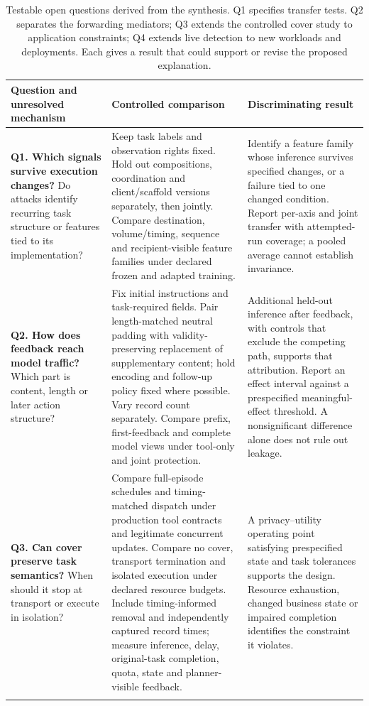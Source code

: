\begin{table}[t]\centering\small
\caption{Testable open questions derived from the synthesis. Q1 specifies transfer tests. Q2 separates the forwarding mediators; Q3 extends the controlled cover study to application constraints; Q4 extends live detection to new workloads and deployments. Each gives a result that could support or revise the proposed explanation.}\label{tab:open-questions}
\setlength{\tabcolsep}{4pt}
\begin{tabularx}{\textwidth}{@{}P{.22\textwidth}P{.43\textwidth}Y@{}}\toprule
Question and unresolved mechanism & Controlled comparison & Discriminating result \\\midrule
\textbf{Q1. Which signals survive execution changes?} Do attacks identify recurring task structure or features tied to its implementation? & Keep task labels and observation rights fixed. Hold out compositions, coordination and client/scaffold versions separately, then jointly. Compare destination, volume/timing, sequence and recipient-visible feature families under declared frozen and adapted training. & Identify a feature family whose inference survives specified changes, or a failure tied to one changed condition. Report per-axis and joint transfer with attempted-run coverage; a pooled average cannot establish invariance. \\\addlinespace[4pt]
\textbf{Q2. How does feedback reach model traffic?} Which part is content, length or later action structure? & Fix initial instructions and task-required fields. Pair length-matched neutral padding with validity-preserving replacement of supplementary content; hold encoding and follow-up policy fixed where possible. Vary record count separately. Compare prefix, first-feedback and complete model views under tool-only and joint protection. & Additional held-out inference after feedback, with controls that exclude the competing path, supports that attribution. Report an effect interval against a prespecified meaningful-effect threshold. A nonsignificant difference alone does not rule out leakage. \\\addlinespace[4pt]
\textbf{Q3. Can cover preserve task semantics?} When should it stop at transport or execute in isolation? & Compare full-episode schedules and timing-matched dispatch under production tool contracts and legitimate concurrent updates. Compare no cover, transport termination and isolated execution under declared resource budgets. Include timing-informed removal and independently captured record times; measure inference, delay, original-task completion, quota, state and planner-visible feedback. & A privacy--utility operating point satisfying prespecified state and task tolerances supports the design. Resource exhaustion, changed business state or impaired completion identifies the constraint it violates. \\\addlinespace[4pt]

\end{tabularx}
\end{table}
